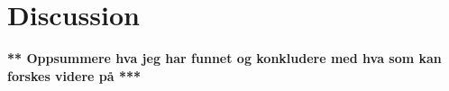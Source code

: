 \section{Discussion}

	{\bf \color{red} ** Oppsummere hva jeg har funnet og konkludere med hva som kan forskes videre på ***}